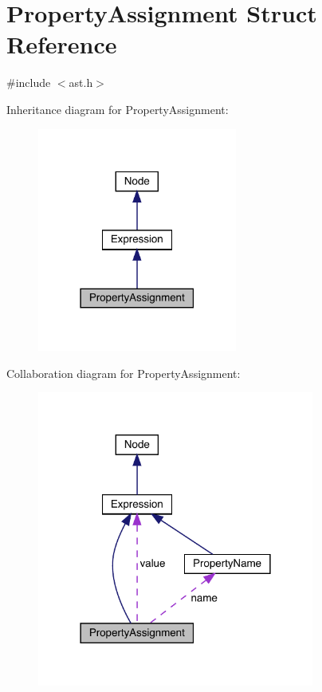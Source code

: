 \hypertarget{struct_property_assignment}{}\section{Property\+Assignment Struct Reference}
\label{struct_property_assignment}


{\ttfamily \#include $<$ast.\+h$>$}



Inheritance diagram for Property\+Assignment\+:
\nopagebreak
\begin{figure}[H]
\begin{center}
\leavevmode
\includegraphics[width=186pt]{struct_property_assignment__inherit__graph}
\end{center}
\end{figure}


Collaboration diagram for Property\+Assignment\+:
\nopagebreak
\begin{figure}[H]
\begin{center}
\leavevmode
\includegraphics[width=258pt]{struct_property_assignment__coll__graph}
\end{center}
\end{figure}
